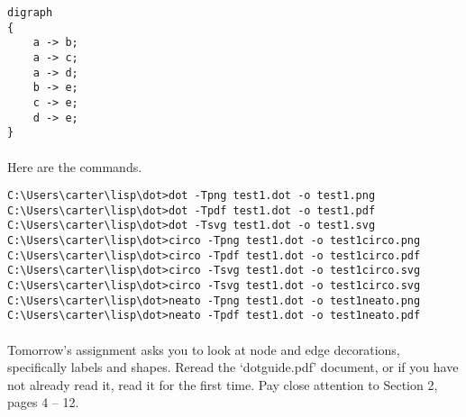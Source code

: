 \documentclass{article}
\begin{document}
\lstset{language=Lisp,numbers=left,keepspaces=false,basicstyle=\small,numberstyle=\tiny,breaklines=true,showstringspaces=false}
\begin{lstlisting}
digraph
{
    a -> b;
    a -> c;
    a -> d;
    b -> e;
    c -> e;
    d -> e;
}
\end{lstlisting}

\paragraph{}Here are the commands.

\lstset{language=Lisp,numbers=left,keepspaces=false,basicstyle=\small,numberstyle=\tiny,breaklines=true,showstringspaces=false}
\begin{lstlisting}
C:\Users\carter\lisp\dot>dot -Tpng test1.dot -o test1.png
C:\Users\carter\lisp\dot>dot -Tpdf test1.dot -o test1.pdf
C:\Users\carter\lisp\dot>dot -Tsvg test1.dot -o test1.svg
C:\Users\carter\lisp\dot>circo -Tpng test1.dot -o test1circo.png
C:\Users\carter\lisp\dot>circo -Tpdf test1.dot -o test1circo.pdf
C:\Users\carter\lisp\dot>circo -Tsvg test1.dot -o test1circo.svg
C:\Users\carter\lisp\dot>circo -Tsvg test1.dot -o test1circo.svg
C:\Users\carter\lisp\dot>neato -Tpng test1.dot -o test1neato.png
C:\Users\carter\lisp\dot>neato -Tpdf test1.dot -o test1neato.pdf
\end{lstlisting}

\paragraph{}Tomorrow's assignment asks you to look at node and edge decorations, specifically labels and shapes. Reread the `dotguide.pdf' document, or if you have not already read it, read it for the first time. Pay close attention to Section 2, pages 4 -- 12.
\end{document}
